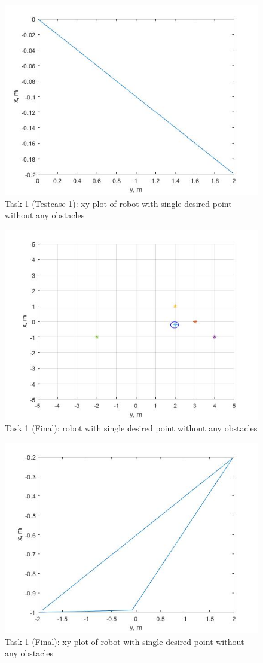 \documentclass{l4proj}
\begin{document}
\begin{figure}[htb]
    \centering
    \includegraphics[width=0.5\linewidth]{images/Task1intialxyplot.jpg}

    \caption{Task 1 (Testcase 1): xy plot of robot with single desired point without any obstacles}
    \label{fig:Model1sim4} 
\end{figure}
\begin{figure}[htb]
    \centering
    \includegraphics[width=0.5\linewidth]{images/Task1finalrobot.jpg}

    \caption{Task 1 (Final): robot with single desired point without any obstacles}
    \label{fig:Model1sim4} 
\end{figure}
\begin{figure}[htb]
    \centering
    \includegraphics[width=0.5\linewidth]{images/Task1finalxyplot.jpg}

    \caption{Task 1 (Final): xy plot of robot with single desired point without any obstacles}
    \label{fig:Model1sim4} 
\end{figure}
\end{document}

